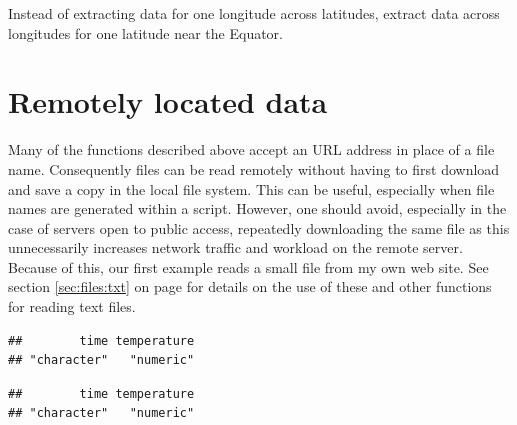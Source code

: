 \documentclass[krantz2]{krantz}\usepackage{knitr}
\begin{document}
\begin{playground}
Instead of extracting data for one longitude across latitudes, extract data across longitudes for one latitude near the Equator.
\end{playground}

\section{Remotely located data}\label{sec:files:remote}

Many of the functions described above accept an URL address in place of a file name. Consequently files can be read remotely without having to first download and save a copy in the local file system. This can be useful, especially when file names are generated within a script. However, one should avoid, especially in the case of servers open to public access, repeatedly downloading the same file as this unnecessarily increases network traffic and workload on the remote server. Because of this, our first example reads a small file from my own web site. See section \ref{sec:files:txt} on page \pageref{sec:files:txt} for details on the use of these and other functions for reading text files.

\begin{knitrout}\footnotesize
{}\color{fgcolor}\begin{kframe}
\begin{alltt}
 \hlkwb{<-}
      \hlstd{(} \hlstd{=} \hlstd{,}
                 \hlstd{=} \hlstd{,}
                 \hlstd{=} \hlstd{(}\hlstd{,} \hlstd{))}
\end{alltt}
\begin{verbatim}
##        time temperature
## "character"   "numeric"
\end{verbatim}
\begin{alltt}
\end{alltt}
\begin{verbatim}
##        time temperature
## "character"   "numeric"
\end{verbatim}
\end{kframe}
\end{knitrout}
\end{document}
